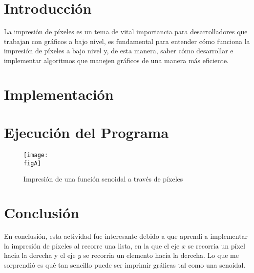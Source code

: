     \restoregeometry %

    \clearpage
    \tableofcontents

    \clearpage
    \listoffigures


    \clearpage
    \lstlistoflistings

    \clearpage
    \vspace*{6pt}
	\centerline{\textbf{\huge \theTitle}}
    \vspace*{8pt}

	\section{Introducción}

	La impresión de píxeles es un tema de vital importancia para desarrolladores que trabajan con gráficos a bajo nivel, es fundamental para entender cómo funciona la impresión de píxeles a bajo nivel y, de esta manera, saber cómo desarrollar e implementar algoritmos que manejen gráficos de una manera más eficiente.

	\clearpage
	\section{Implementación}

	

	\clearpage
	\section{Ejecución del Programa}

	\begin{figure}[h]
		\centering
		\texttt{[image: \\figA]}
		\caption{Impresión de una función senoidal a través de píxeles}
	\end{figure}

	\clearpage
	\section{Conclusión}

	En conclusión, esta actividad fue interesante debido a que aprendí a implementar la impresión de píxeles al recorre una lista, en la que el eje $x$ se recorria un píxel hacia la derecha y el eje $y$ se recorria un elemento hacia la derecha. Lo que me sorprendió es qué tan sencillo puede ser imprimir gráficas tal como una senoidal.

